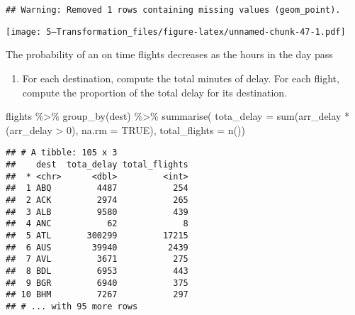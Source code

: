 \documentclass[
]{article}
\newenvironment{Shaded}{\begin{snugshade}}{\end{snugshade}}
\newcommand{\AttributeTok}[1]{\textcolor[rgb]{0.77,0.63,0.00}{#1}}
\newcommand{\ConstantTok}[1]{\textcolor[rgb]{0.00,0.00,0.00}{#1}}
\newcommand{\DecValTok}[1]{\textcolor[rgb]{0.00,0.00,0.81}{#1}}
\newcommand{\FunctionTok}[1]{\textcolor[rgb]{0.00,0.00,0.00}{#1}}
\newcommand{\NormalTok}[1]{#1}
\newcommand{\SpecialCharTok}[1]{\textcolor[rgb]{0.00,0.00,0.00}{#1}}
\providecommand{\tightlist}{%
  \setlength{\itemsep}{0pt}\setlength{\parskip}{0pt}}
\begin{document}
\begin{verbatim}
## Warning: Removed 1 rows containing missing values (geom_point).
\end{verbatim}

\texttt{[image: 5---Transformation\_files/figure-latex/unnamed-chunk-47-1.pdf]}

The probability of an on time flights decreases as the hours in the day
pass

\begin{enumerate}
\def\labelenumi{\arabic{enumi}.}
\tightlist
\item
  For each destination, compute the total minutes of delay. For each
  flight, compute the proportion of the total delay for its destination.
\end{enumerate}

\begin{Shaded}
\begin{Highlighting}[]
\NormalTok{flights }\SpecialCharTok{\%\textgreater{}\%} 
  \FunctionTok{group\_by}\NormalTok{(dest) }\SpecialCharTok{\%\textgreater{}\%} 
  \FunctionTok{summarise}\NormalTok{( }\AttributeTok{tota\_delay =} \FunctionTok{sum}\NormalTok{(arr\_delay }\SpecialCharTok{*}\NormalTok{ (arr\_delay }\SpecialCharTok{\textgreater{}} \DecValTok{0}\NormalTok{), }
                              \AttributeTok{na.rm =} \ConstantTok{TRUE}\NormalTok{),}
          \AttributeTok{total\_flights =} \FunctionTok{n}\NormalTok{())}
\end{Highlighting}
\end{Shaded}

\begin{verbatim}
## # A tibble: 105 x 3
##    dest  tota_delay total_flights
##  * <chr>      <dbl>         <int>
##  1 ABQ         4487           254
##  2 ACK         2974           265
##  3 ALB         9580           439
##  4 ANC           62             8
##  5 ATL       300299         17215
##  6 AUS        39940          2439
##  7 AVL         3671           275
##  8 BDL         6953           443
##  9 BGR         6940           375
## 10 BHM         7267           297
## # ... with 95 more rows
\end{verbatim}
\end{document}
